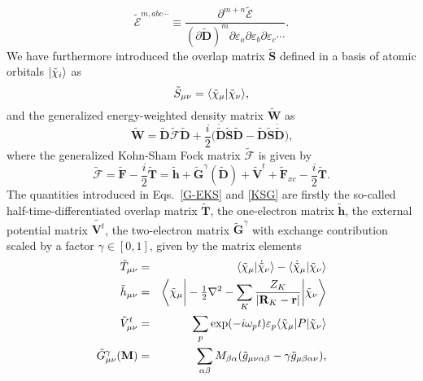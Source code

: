 \documentclass[%
 reprint,
 amsmath,amssymb,
 aps,
]{revtex4-1}
\begin{document}
\begin{equation}\label{E-chain-rule}
\tilde{\mathcal{E}}^{m, abc\cdots} \equiv \frac{\partial^{m + n}\tilde{\mathcal{E}}}{ \left( \partial \tilde{\mathbf{D}} \right)^{m} \partial \varepsilon_{a} \partial \varepsilon_{b} \partial \varepsilon_{c} \cdots}\text{.}
\end{equation}
We have furthermore introduced the overlap matrix $\tilde{\mathbf{S}}$ defined in a basis of atomic orbitals $|\tilde{\chi}_{i}\rangle$ as 
\begin{equation}\label{S}
\tilde{S}_{\mu \nu} = \langle\tilde{\chi}_{\mu} |\tilde{\chi}_{\nu}\rangle \text{,}
\end{equation}
and the generalized energy-weighted density matrix $\tilde{\mathbf{W}}$ as 
\begin{equation}\label{W}
\tilde{\mathbf{W}} =
\tilde{\mathbf{D}} \tilde{\bm{\mathcal{F}}} \tilde{\mathbf{D}} +
{\textstyle \frac{i}{2}} \bigl(
\dot{\tilde{\mathbf{D}}} \tilde{\mathbf{S}} \tilde{\mathbf{D}}
-\tilde{\mathbf{D}} \tilde{\mathbf{S}} \dot{\tilde{\mathbf{D}}}
\bigr)\text{,}
\end{equation}
where the generalized Kohn-Sham Fock matrix $\tilde{\bm{\mathcal{F}}}$ is given by
\begin{equation}\label{KSG}
\tilde{\bm{\mathcal{F}}} = \tilde{\mathbf{F}} - {\textstyle \frac{i}{2}} \tilde{\mathbf{T}} =
\tilde{\mathbf{h}} +
\tilde{\mathbf{G}}^{\gamma} (\tilde{\mathbf{D}}) 
+ \tilde{\mathbf{V}}^t + \tilde{\mathbf{F}}_{xc} - {\textstyle \frac{i}{2}} \tilde{\mathbf{T}}\text{.}
\end{equation}
The quantities introduced in Eqs.~\eqref{G-EKS} and \eqref{KSG} are firstly the so-called half-time-differentiated overlap matrix $\tilde{\mathbf{T}}$, the one-electron matrix $\tilde{\mathbf{h}}$, the external potential matrix $\tilde{\mathbf{V}^{t}}$, the two-electron matrix $\tilde{\mathbf{G}}^{\gamma}$ with exchange contribution scaled by a factor $\gamma \in [0,1]$, given by the matrix elements
\begin{eqnarray}
\label{t-matrix}
\tilde{T}_{\mu \nu} &=& \langle\tilde{\chi}_{\mu} |\dot{\tilde{\chi}}_{\nu}\rangle - \langle\dot{\tilde{\chi}}_{\mu} |\tilde{\chi}_{\nu}\rangle \\
\label{h-matrix}
\tilde{h}_{\mu \nu} &=& \biggr{\langle} \tilde{\chi}_{\mu} \biggr{|}  
- {\textstyle \frac{1}{2}} \nabla^2 - \sum_K \frac{Z_K}{|\mathbf{R}_K-\mathbf{r}|} 
\biggr{|} \tilde{\chi}_{\nu} \biggr{\rangle} \\ \label{Vt_munu}
\tilde{V}^t_{\mu \nu} &=& 
\sum_{p} \exp(-i \omega_p t) \varepsilon_{p} 
\langle\tilde{\chi}_{\mu}| 
P
|\tilde{\chi}_{\nu}\rangle \\
\label{G-matrix}
\tilde{G}^{\gamma}_{\mu \nu}(\mathbf{M}) &=& \sum_{\alpha \beta} M_{\beta \alpha} (\tilde{g}_{\mu \nu \alpha \beta} - \gamma \tilde{g}_{\mu \beta \alpha \nu}) \text{,}
\end{eqnarray}
\end{document}
